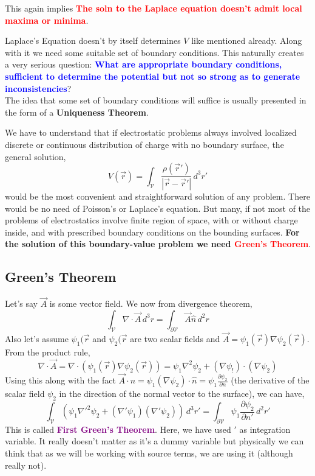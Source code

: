 \documentclass{article}
\begin{document}
This again implies \textcolor{red}{\textbf{The soln to the Laplace equation doesn't admit local maxima or minima}}.

Laplace's Equation doesn't by itself determines $V$ like mentioned already. Along with it we need some suitable set of boundary conditions. This naturally creates a very serious question: \textcolor{blue}{\textbf{What are appropriate boundary conditions, sufficient to determine the potential but not so strong as to generate inconsistencies}}?\\
The idea that some set of boundary conditions will suffice is usually presented in the form of a \textbf{Uniqueness Theorem}. 

We have to understand that if electrostatic problems always involved localized discrete or continuous distribution of charge with no boundary surface, the general solution,
\begin{equation}
    V(\vec{r})=\int_{\mathcal{V}} \frac{\rho(\vec{r}')}{|\vec{r}-\vec{r}'|}\, d^3r'
    \label{pot_estat_g}
\end{equation}
would be the most convenient and straightforward solution of any problem. There would be no need of Poisson's or Laplace's equation. But many, if not most of the problems of electrostatics involve finite region of space, with or without charge inside, and with prescribed boundary conditions on the bounding surfaces. \textbf{For the solution of this boundary-value problem we need \textcolor{red}{Green's Theorem}}.
\subsection{Green's Theorem}
Let's say $\vec{A}$ is some vector field. We now from divergence theorem,
\begin{equation}
    \int_{\mathcal{V}}\nabla\cdot \vec{A}\, d^3r = \int_{\mathcal{\partial V}}\vec{A} \hat{n}\, d^2r
\end{equation}
Also let's assume $\psi_1(\vec{r}$ and $\psi_2(\vec{r}$ are two scalar fields and $\vec{A}=\psi_1(\vec{r})\nabla\psi_2(\vec{r})$. From the product rule,
\begin{equation}
    \nabla \cdot \vec{A} = \nabla \cdot (\psi_1(\vec{r})\nabla\psi_2(\vec{r}))=\psi_1 \nabla^2 \psi_2 + (\nabla \psi_!)\cdot (\nabla \psi_2)
\end{equation}
Using this along with the fact $\vec{A}\cdot n = \psi_1 (\nabla \psi_2)\cdot \hat{n}=\psi_1 \frac{\partial \psi_2}{\partial n}$ (the derivative of the scalar field $\psi_2$ in the direction of the normal vector to the surface), we can have,
\begin{equation}
    \int_{\mathcal{V}} (\psi_1 \nabla'^2 \psi_2 + (\nabla' \psi_1)(\nabla' \psi_2))\, d^3 r' = \int_{\partial \mathcal{V}}\psi_1 \frac{\partial \psi_2}{\partial n'}\, d^2 r'
    \label{green_th_1}
\end{equation}
This is called \textcolor{purple}{\textbf{First Green's Theorem}}. Here, we have used $'$ as integration variable. It really doesn't matter as it's a dummy variable but physically we can think that as we will be working with source terms, we are using it (although really not).
\end{document}

